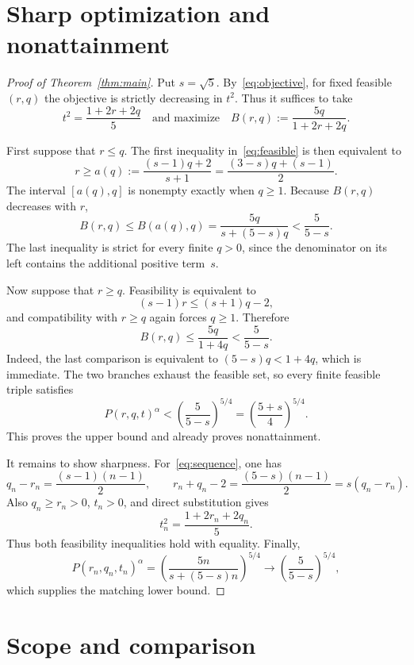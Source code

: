 \documentclass[11pt]{article}
\begin{document}
\section{Sharp optimization and nonattainment}

\begin{proof}[Proof of Theorem~\ref{thm:main}]
Put \(s=\sqrt5\).  By~\eqref{eq:objective}, for fixed feasible \((r,q)\)
the objective is strictly decreasing in \(t^2\).  Thus it suffices to take
\[
 t^2=\frac{1+2r+2q}{5}
 \quad\text{and maximize}\quad
 B(r,q):=\frac{5q}{1+2r+2q}.
\]

First suppose that \(r\leq q\).  The first inequality
in~\eqref{eq:feasible} is then equivalent to
\[
 r\geq a(q):=\frac{(s-1)q+2}{s+1}
 =\frac{(3-s)q+(s-1)}{2}.
\]
The interval \([a(q),q]\) is nonempty exactly when \(q\geq1\).  Because
\(B(r,q)\) decreases with \(r\),
\begin{equation}\label{eq:firstbranch}
 B(r,q)\leq B(a(q),q)
 =\frac{5q}{s+(5-s)q}
 <\frac{5}{5-s}.
\end{equation}
The last inequality is strict for every finite \(q>0\), since the denominator
on its left contains the additional positive term~\(s\).

Now suppose that \(r\geq q\).  Feasibility is equivalent to
\[
 (s-1)r\leq(s+1)q-2,
\]
and compatibility with \(r\geq q\) again forces \(q\geq1\).  Therefore
\begin{equation}\label{eq:secondbranch}
 B(r,q)\leq\frac{5q}{1+4q}<\frac{5}{5-s}.
\end{equation}
Indeed, the last comparison is equivalent to
\((5-s)q<1+4q\), which is immediate.  The two branches exhaust the feasible
set, so every finite feasible triple satisfies
\[
 P(r,q,t)^\alpha
 <\left(\frac{5}{5-s}\right)^{5/4}
 =\left(\frac{5+s}{4}\right)^{5/4}.
\]
This proves the upper bound and already proves nonattainment.

It remains to show sharpness.  For~\eqref{eq:sequence}, one has
\[
 q_n-r_n=\frac{(s-1)(n-1)}2,
 \qquad
 r_n+q_n-2=\frac{(5-s)(n-1)}2=s(q_n-r_n).
\]
Also \(q_n\geq r_n>0\), \(t_n>0\), and direct substitution gives
\[
 t_n^2=\frac{1+2r_n+2q_n}{5}.
\]
Thus both feasibility inequalities hold with equality.  Finally,
\[
 P(r_n,q_n,t_n)^\alpha
 =\left(\frac{5n}{s+(5-s)n}\right)^{5/4}
 \longrightarrow
 \left(\frac{5}{5-s}\right)^{5/4},
\]
which supplies the matching lower bound.
\end{proof}

\section{Scope and comparison}
\end{document}
